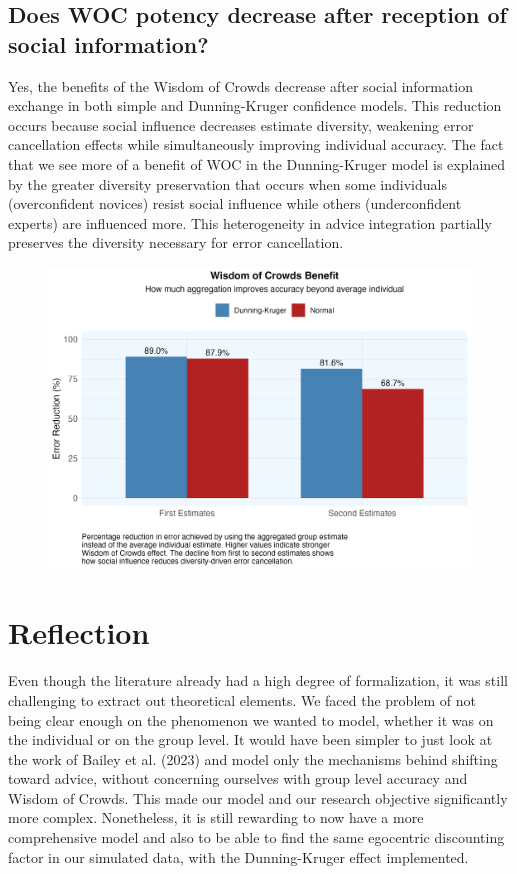 \documentclass[
  man,floatsintext]{apa6}
\begin{document}
\hypertarget{does-woc-potency-decrease-after-reception-of-social-information}{%
\subsection{Does WOC potency decrease after reception of social information?}\label{does-woc-potency-decrease-after-reception-of-social-information}}

Yes, the benefits of the Wisdom of Crowds decrease after social information exchange in both simple and Dunning-Kruger confidence models. This reduction occurs because social influence decreases estimate diversity, weakening error cancellation effects while simultaneously improving individual accuracy. The fact that we see more of a benefit of WOC in the Dunning-Kruger model is explained by the greater diversity preservation that occurs when some individuals (overconfident novices) resist social influence while others (underconfident experts) are influenced more. This heterogeneity in advice integration partially preserves the diversity necessary for error cancellation.

\begin{figure}[H]
\includegraphics[width=7in]{photos/woc_effect} \caption{ }\label{fig:unnamed-chunk-7}
\end{figure}

\hypertarget{reflection}{%
\section{Reflection}\label{reflection}}

Even though the literature already had a high degree of formalization, it was still challenging to extract out theoretical elements. We faced the problem of not being clear enough on the phenomenon we wanted to model, whether it was on the individual or on the group level. It would have been simpler to just look at the work of Bailey et al. (2023) and model only the mechanisms behind shifting toward advice, without concerning ourselves with group level accuracy and Wisdom of Crowds. This made our model and our research objective significantly more complex. Nonetheless, it is still rewarding to now have a more comprehensive model and also to be able to find the same egocentric discounting factor in our simulated data, with the Dunning-Kruger effect implemented.
\end{document}
